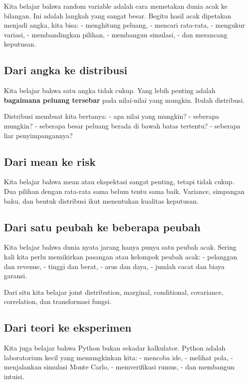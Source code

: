 \documentclass[
  letterpaper,
  DIV=11,
  numbers=noendperiod]{scrreprt}
\begin{document}
Kita belajar bahwa random variable adalah cara memetakan dunia acak ke
bilangan. Ini adalah langkah yang sangat besar. Begitu hasil acak
dipetakan menjadi angka, kita bisa: - menghitung peluang, - mencari
rata-rata, - mengukur variasi, - membandingkan pilihan, - membangun
simulasi, - dan merancang keputusan.

\subsection{Dari angka ke distribusi}\label{dari-angka-ke-distribusi}

Kita belajar bahwa satu angka tidak cukup. Yang lebih penting adalah
\textbf{bagaimana peluang tersebar} pada nilai-nilai yang mungkin.
Itulah distribusi.

Distribusi membuat kita bertanya: - apa nilai yang mungkin? - seberapa
mungkin? - seberapa besar peluang berada di bawah batas tertentu? -
seberapa liar penyimpangannya?

\subsection{Dari mean ke risk}\label{dari-mean-ke-risk}

Kita belajar bahwa mean atau ekspektasi sangat penting, tetapi tidak
cukup. Dua pilihan dengan rata-rata sama belum tentu sama baik.
Variance, simpangan baku, dan bentuk distribusi ikut menentukan kualitas
keputusan.

\subsection{Dari satu peubah ke beberapa
peubah}\label{dari-satu-peubah-ke-beberapa-peubah}

Kita belajar bahwa dunia nyata jarang hanya punya satu peubah acak.
Sering kali kita perlu memikirkan pasangan atau kelompok peubah acak: -
pelanggan dan revenue, - tinggi dan berat, - arus dan daya, - jumlah
cacat dan biaya garansi.

Dari situ kita belajar joint distribution, marginal, conditional,
covariance, correlation, dan transformasi fungsi.

\subsection{Dari teori ke eksperimen}\label{dari-teori-ke-eksperimen}

Kita juga belajar bahwa Python bukan sekadar kalkulator. Python adalah
laboratorium kecil yang memungkinkan kita: - mencoba ide, - melihat
pola, - menjalankan simulasi Monte Carlo, - memverifikasi rumus, - dan
membangun intuisi.
\end{document}
